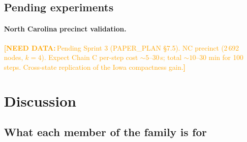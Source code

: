 \documentclass[11pt]{article}
\newcommand{\needdata}[1]{\textcolor{orange}{\textbf{[NEED DATA:}\,#1\textbf{]}}}
\begin{document}
\subsection{Pending experiments}\label{sec:exp-pending}

\paragraph{North Carolina precinct validation.}\label{sec:exp-nc}
\needdata{Pending Sprint 3 (PAPER\_PLAN \S7.5). NC precinct (2\,692
nodes, $k = 4$). Expect Chain C per-step cost $\sim 5$--30\,s; total
$\sim 10$--30 min for 100 steps. Cross-state replication of the
Iowa compactness gain.}

\section{Discussion}\label{sec:discussion}

\subsection{What each member of the family is for}\label{sec:disc-roles}
\end{document}
